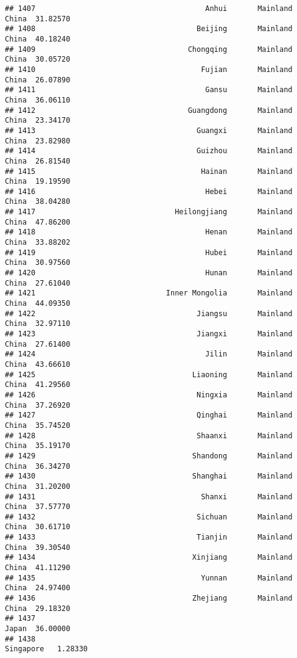 \documentclass[
]{article}
\begin{document}
\begin{verbatim}
## 1407                                       Anhui       Mainland China  31.82570
## 1408                                     Beijing       Mainland China  40.18240
## 1409                                   Chongqing       Mainland China  30.05720
## 1410                                      Fujian       Mainland China  26.07890
## 1411                                       Gansu       Mainland China  36.06110
## 1412                                   Guangdong       Mainland China  23.34170
## 1413                                     Guangxi       Mainland China  23.82980
## 1414                                     Guizhou       Mainland China  26.81540
## 1415                                      Hainan       Mainland China  19.19590
## 1416                                       Hebei       Mainland China  38.04280
## 1417                                Heilongjiang       Mainland China  47.86200
## 1418                                       Henan       Mainland China  33.88202
## 1419                                       Hubei       Mainland China  30.97560
## 1420                                       Hunan       Mainland China  27.61040
## 1421                              Inner Mongolia       Mainland China  44.09350
## 1422                                     Jiangsu       Mainland China  32.97110
## 1423                                     Jiangxi       Mainland China  27.61400
## 1424                                       Jilin       Mainland China  43.66610
## 1425                                    Liaoning       Mainland China  41.29560
## 1426                                     Ningxia       Mainland China  37.26920
## 1427                                     Qinghai       Mainland China  35.74520
## 1428                                     Shaanxi       Mainland China  35.19170
## 1429                                    Shandong       Mainland China  36.34270
## 1430                                    Shanghai       Mainland China  31.20200
## 1431                                      Shanxi       Mainland China  37.57770
## 1432                                     Sichuan       Mainland China  30.61710
## 1433                                     Tianjin       Mainland China  39.30540
## 1434                                    Xinjiang       Mainland China  41.11290
## 1435                                      Yunnan       Mainland China  24.97400
## 1436                                    Zhejiang       Mainland China  29.18320
## 1437                                                            Japan  36.00000
## 1438                                                        Singapore   1.28330

\end{verbatim}
\end{document}

